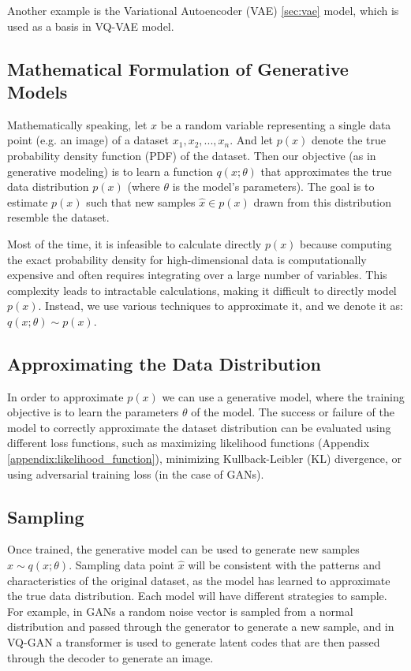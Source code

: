 Another example is the Variational Autoencoder (VAE) \cite{vae} \ref{sec:vae} model, which is used as a basis in VQ-VAE model. 



\subsection{Mathematical Formulation of Generative Models}
Mathematically speaking, let $x$ be a random variable representing a single data point (e.g. an image) of a dataset ${x_1,x_2,...,x_n}$. And let $p(x)$ denote the true probability density function (PDF) of the dataset. Then our objective (as in generative modeling) is to learn a function $q(x;\theta)$ that approximates the true data distribution $p(x)$ (where $\theta$ is the model's parameters). The goal is to estimate $p(x)$ such that new samples $\hat{x} \in p(x)$ drawn from this distribution resemble the dataset.

Most of the time, it is infeasible to calculate directly $p(x)$ because computing the exact probability density for high-dimensional data is computationally expensive and often requires integrating over a large number of variables. This complexity leads to intractable calculations, making it difficult to directly model $p(x)$. Instead, we use various techniques to approximate it, and we denote it as: $q(x;\theta) \sim p(x)$.

\subsection{Approximating the Data Distribution}

In order to approximate $p(x)$ we can use a generative model, where the training objective is to learn the parameters $\theta$ of the model. The success or failure of the model to correctly approximate the dataset distribution can be evaluated using different loss functions, such as maximizing likelihood functions (Appendix \ref{appendix:likelihood_function}), minimizing Kullback-Leibler (KL) divergence, or using adversarial training loss (in the case of GANs).

\subsection{Sampling}

Once trained, the generative model can be used to generate new samples $\hat{x} \sim q(x;\theta)$. Sampling data point $\hat{x}$ will be consistent with the patterns and characteristics of the original dataset, as the model has learned to approximate the true data distribution. Each model will have different strategies to sample. For example, in GANs a random noise vector is sampled from a normal distribution and passed through the generator to generate a new sample, and in VQ-GAN a transformer is used to generate latent codes that are then passed through the decoder to generate an image.

